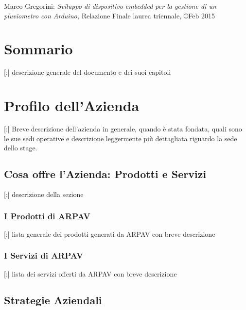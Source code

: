 \documentclass[11pt]{book}              %
\begin{document}
\newpage
\thispagestyle{empty}
\vspace*{\fill}

Marco Gregorini: \textit{Sviluppo di dispositivo embedded per la gestione di un pluviometro con Arduino,} Relazione Finale laurea triennale, \copyright Feb 2015

\newpage

\chapter{Sommario}
[:] descrizione generale del documento e dei suoi capitoli
                          

\newpage
\thispagestyle{empty}

\tableofcontents    

\newpage
\thispagestyle{empty}

                  
\mainmatter       
  

\chapter{Profilo dell'Azienda}

\thispagestyle{fancy} 

[:] Breve descrizione dell'azienda in generale, quando è stata fondata, quali sono le sue sedi operative e descrizione leggermente più dettagliata riguardo la sede dello stage.

\section{Cosa offre l'Azienda: Prodotti e Servizi}

[:] descrizione della sezione

\subsection{I Prodotti di ARPAV}

[:] lista generale dei prodotti generati da ARPAV con breve descrizione

\subsection{I Servizi di ARPAV}

[:] lista dei servizi offerti da ARPAV con breve descrizione

\section{Strategie Aziendali}
\end{document}
